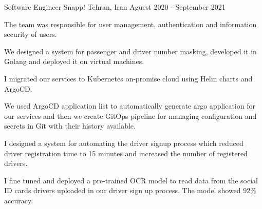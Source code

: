 
\begin{cventries}

  \cventry
    {Software Engineer} %
    {Snapp!} %
    {Tehran, Iran} %
    {Aguest 2020 - September 2021} %
    {
      \begin{cvitems} %
        \item The team was responsible for user management, authentication and information security of users.
        \item We designed a system for passenger and driver number masking, developed it in Golang and deployed it on virtual machines.
        \item I migrated our services to Kubernetes on‐promise cloud using Helm charts and ArgoCD.
        \item We used ArgoCD application list to automatically generate argo application for our services and then we create GitOps pipeline for managing configuration and secrets in Git with their history available.
        \item I designed a system for automating the driver signup process which reduced driver registration time to 15 minutes and increased the number of registered drivers.
        \item I fine tuned and deployed a pre-trained OCR model to read data from the social ID cards drivers uploaded in our driver sign up process. The model showed 92\% accuracy.
      \end{cvitems}
    }


\end{cventries}
